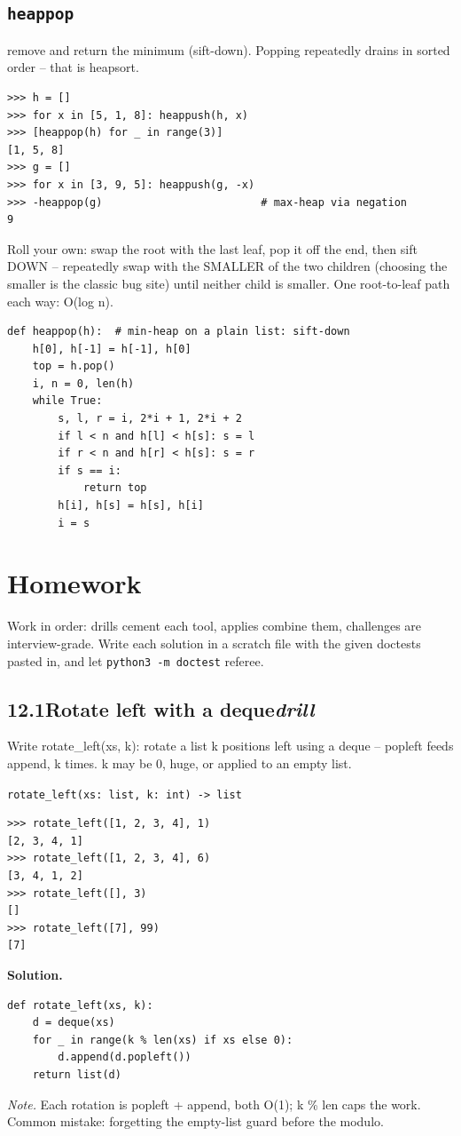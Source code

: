 \documentclass[10pt,letterpaper]{book}
\begin{document}
\subsection{\texttt{heappop}}\label{def:heappop}
remove and return the minimum (sift-down). Popping repeatedly drains in sorted order -- that is heapsort.
\begin{lstlisting}[style=ex]
>>> h = []
>>> for x in [5, 1, 8]: heappush(h, x)
>>> [heappop(h) for _ in range(3)]
[1, 5, 8]
>>> g = []
>>> for x in [3, 9, 5]: heappush(g, -x)
>>> -heappop(g)                         # max-heap via negation
9
\end{lstlisting}

Roll your own: swap the root with the last leaf, pop it off the end, then sift DOWN -- repeatedly swap with the SMALLER of the two children (choosing the smaller is the classic bug site) until neither child is smaller. One root-to-leaf path each way: O(log n).

\begin{lstlisting}[style=ex]
def heappop(h):  # min-heap on a plain list: sift-down
    h[0], h[-1] = h[-1], h[0]
    top = h.pop()
    i, n = 0, len(h)
    while True:
        s, l, r = i, 2*i + 1, 2*i + 2
        if l < n and h[l] < h[s]: s = l
        if r < n and h[r] < h[s]: s = r
        if s == i:
            return top
        h[i], h[s] = h[s], h[i]
        i = s
\end{lstlisting}

\section{Homework}
Work in order: drills cement each tool, applies combine them,
challenges are interview-grade. Write each solution in a scratch file with
the given doctests pasted in, and let \texttt{python3 -m doctest} referee.
\subsection*{12.1\quad Rotate left with a deque\hfill\textnormal{\textit{drill}}}
Write rotate\_left(xs, k): rotate a list k positions left using a deque -- popleft feeds append, k times. k may be 0, huge, or applied to an empty list.

\noindent\texttt{rotate\_left(xs: list, k: int) -> list}
\begin{lstlisting}[style=ex]
>>> rotate_left([1, 2, 3, 4], 1)
[2, 3, 4, 1]
>>> rotate_left([1, 2, 3, 4], 6)
[3, 4, 1, 2]
>>> rotate_left([], 3)
[]
>>> rotate_left([7], 99)
[7]
\end{lstlisting}
\noindent\textbf{Solution.}
\begin{lstlisting}[style=code]
def rotate_left(xs, k):
    d = deque(xs)
    for _ in range(k % len(xs) if xs else 0):
        d.append(d.popleft())
    return list(d)
\end{lstlisting}
\noindent\textit{Note.} Each rotation is popleft + append, both O(1); k \% len caps the work. Common mistake: forgetting the empty-list guard before the modulo.
\end{document}
